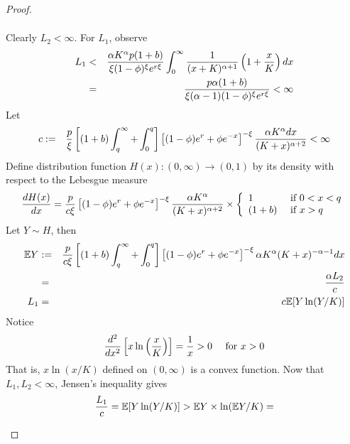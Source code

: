\documentclass{article}
\begin{document}
\begin{proof}
\begin{enumerate}[i.]
\begin{eqnarray*}
    \end{eqnarray*}
    Clearly $L_2 < \infty$. For $L_1$, observe
    \begin{eqnarray*}
      L_1 &<& {
        \alpha K^\alpha p (1 + b)
        \over
        \xi (1 - \phi)^\xi e^{r \xi}
      } \int_0^\infty
      {1 \over (x + K)^{\alpha + 1}}
      \left(1 + {x \over K}\right)
      dx \\
      &=&
      {
        p \alpha (1 + b)
        \over
        \xi (\alpha - 1) (1 - \phi)^\xi e^{r \xi}
      } < \infty
    \end{eqnarray*}
    Let
    \begin{eqnarray*}
      c &:=& {p \over \xi}
      \left[
      (1 + b)\int_{q}^{\infty} +
      \int_{0}^q
      \right]
      \left[
        (1 - \phi) e^r + \phi e^{-x}
      \right]^{-\xi}
      {
        \alpha K^{\alpha} dx \over (K + x)^{\alpha + 2}
      } < \infty
    \end{eqnarray*}
    Define distribution function $H(x): (0, \infty) \to (0, 1)$ by its
    density with respect to the Lebesgue measure
    \[
      {d H(x) \over d x}
      =
      {p \over c \xi}
      \left[
        (1 - \phi) e^r + \phi e^{-x}
        \right]^{-\xi}
      {
        \alpha K^{\alpha}
        \over
        (K + x)^{\alpha + 2}
      }
      \times
      \left\{
      \begin{array}{ll}
        1 & \text{ if } 0 < x < q \\
        (1 + b) & \text{ if } x > q \\
      \end{array}
      \right.
    \]
    Let $Y \sim H$, then
    \begin{eqnarray*}
      \mathbb{E} Y &:=& {p \over c \xi}
      \left[
        (1 + b)\int_{q}^{\infty} +
        \int_{0}^q
        \right]
      \left[
        (1 - \phi) e^r + \phi e^{-x}
        \right]^{-\xi}
      \alpha K^{\alpha} (K + x)^{-\alpha - 1} dx \\
      &=& {\alpha L_2 \over c} \\
      L_1 &=& c \mathbb{E}[Y \ln(Y/K)]
    \end{eqnarray*}
    Notice
    \[
      {
        d^2
        \over
        dx^2
      }
      \left[
        x \ln\left({x \over K}\right)
      \right] = {1 \over x} > 0
      \quad \text{ for } x > 0
    \]
    That is, $x \ln(x/K)$ defined on $(0, \infty)$ is a convex
    function. Now that $L_1, L_2 < \infty$, Jensen's inequality gives
    \[
      {L_1 \over c} = \mathbb{E} [Y \ln(Y/K)]
      >
      \mathbb{E} Y \times \ln(\mathbb{E} Y/K)
      =
\]
\end{enumerate}
\end{proof}
\end{document}
